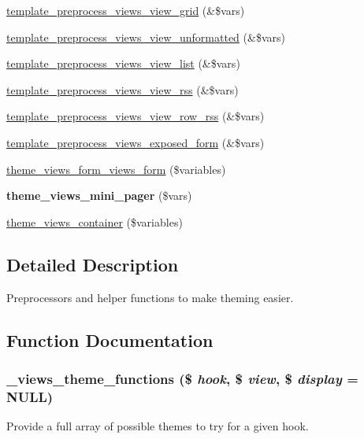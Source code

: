 \begin{DoxyCompactItemize}
\item 
\hyperlink{views_2theme_2theme_8inc_a4e72869a18e87d13a2247003b19a2126}{template\_\-preprocess\_\-views\_\-view\_\-grid} (\&\$vars)
\item 
\hyperlink{views_2theme_2theme_8inc_a98feb8e95b4f2a2cf7a901ae00cd8d97}{template\_\-preprocess\_\-views\_\-view\_\-unformatted} (\&\$vars)
\item 
\hyperlink{views_2theme_2theme_8inc_afa6e6b67428bc1104aaa46766f46f14c}{template\_\-preprocess\_\-views\_\-view\_\-list} (\&\$vars)
\item 
\hyperlink{views_2theme_2theme_8inc_abb7ecccf4a4116df254ce0d5b36af80f}{template\_\-preprocess\_\-views\_\-view\_\-rss} (\&\$vars)
\item 
\hyperlink{views_2theme_2theme_8inc_afdf403957b27d90455f81e19a5a4d611}{template\_\-preprocess\_\-views\_\-view\_\-row\_\-rss} (\&\$vars)
\item 
\hyperlink{views_2theme_2theme_8inc_a512315c0c9812618259dbc4f0f827efc}{template\_\-preprocess\_\-views\_\-exposed\_\-form} (\&\$vars)
\item 
\hyperlink{views_2theme_2theme_8inc_a29ca03c025eb650d6aa308f0152f5323}{theme\_\-views\_\-form\_\-views\_\-form} (\$variables)
\item 
\hypertarget{views_2theme_2theme_8inc_a3693cc8903ea7f30d937ebbedc001eef}{
{\bfseries theme\_\-views\_\-mini\_\-pager} (\$vars)}
\label{views_2theme_2theme_8inc_a3693cc8903ea7f30d937ebbedc001eef}

\item 
\hyperlink{views_2theme_2theme_8inc_ab7ef99fc936aacf3ebcbac40378f760f}{theme\_\-views\_\-container} (\$variables)
\end{DoxyCompactItemize}


\subsection{Detailed Description}
Preprocessors and helper functions to make theming easier. 

\subsection{Function Documentation}
\hypertarget{views_2theme_2theme_8inc_acf9e7bcb84ebc378f901f483143d0ff0}{
\subsubsection[{\_\-views\_\-theme\_\-functions}]{\setlength{\rightskip}{0pt plus 5cm}\_\-views\_\-theme\_\-functions (\$ {\em hook}, \/  \$ {\em view}, \/  \$ {\em display} = {\ttfamily NULL})}}
\label{views_2theme_2theme_8inc_acf9e7bcb84ebc378f901f483143d0ff0}
Provide a full array of possible themes to try for a given hook.



